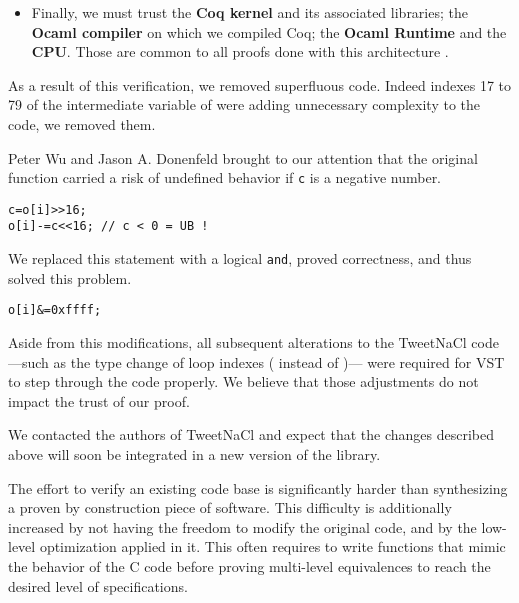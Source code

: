 \begin{itemize}
  \item Finally, we must trust the \textbf{Coq kernel} and its
        associated libraries; the \textbf{Ocaml compiler} on which we compiled Coq;
        the \textbf{Ocaml Runtime} and the \textbf{CPU}. Those are common to all proofs
        done with this architecture \cite{2015-Appel,coq-faq}.
\end{itemize}

As a result of this verification, we removed superfluous code.
Indeed indexes 17 to 79 of the  intermediate variable of
 were adding unnecessary complexity to the code,
we removed them.

Peter Wu and Jason A. Donenfeld brought to our attention that the original
 function carried a risk of undefined behavior if \texttt{c}
is a negative number.
\begin{lstlisting}[language=Ctweetnacl,stepnumber=0]
c=o[i]>>16;
o[i]-=c<<16; // c < 0 = UB !
\end{lstlisting}
We replaced this statement with a logical \texttt{and}, proved correctness,
and thus solved this problem.
\begin{lstlisting}[language=Ctweetnacl,stepnumber=0]
o[i]&=0xffff;
\end{lstlisting}

Aside from this modifications, all subsequent alterations to the TweetNaCl code%
---such as the type change of loop indexes ( instead of )---%
were required for VST to step through the code properly. We believe that those
adjustments do not impact the trust of our proof.

We contacted the authors of TweetNaCl and expect that the changes described
above will soon be integrated in a new version of the library.




 The effort to verify an existing code base is
significantly harder than synthesizing a proven by construction piece of software.
This difficulty is additionally increased by not having the freedom to modify
the original code, and by the low-level optimization applied in it.
This often requires to write functions that mimic the behavior of the C
code before proving multi-level equivalences to reach the desired level of specifications.

